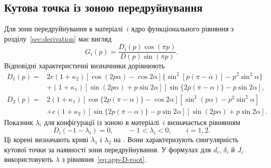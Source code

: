 \subsection{Кутова точка із зоною передруйнування}

Для зони передруйнування в матеріалі~$i$ ядро функціонального рівняння з розділу~\ref{sec:derivation} має вигляд
\begin{equation*}
  G_i(p)=\frac{D_i(p)\cos(\pi p)}{D(p)\sin(\pi p)}.
\end{equation*}
Відповідні характеристичні визначники дорівнюють
\begin{equation}
\label{eq:app-post-zone-determinants}
\begin{aligned}
  D_1(p)={}&2e(1+\kappa_2)
  [\cos(2p\alpha)-\cos2\alpha]
  \{\sin^2[p(\pi-\alpha)]-p^2\sin^2\alpha\}\\
  &+(1+\kappa_1)
  [\sin(2p\alpha)+p\sin2\alpha]
  [\sin\{2p(\pi-\alpha)\}-p\sin2\alpha],\\[3pt]
  D_2(p)={}&2(1+\kappa_1)
  [\cos\{2p(\pi-\alpha)\}-\cos2\alpha]
  [\sin^2(p\alpha)-p^2\sin^2\alpha]\\
  &+e(1+\kappa_2)
  [\sin\{2p(\pi-\alpha)\}-p\sin2\alpha]
  [\sin(2p\alpha)+p\sin2\alpha].
\end{aligned}
\end{equation}
Показник $\lambda_i$ для конфігурації із зоною в матеріалі~$i$ визначається рівнянням
\begin{equation}
\label{eq:app-post-zone-root}
  D_i(-1-\lambda_i)=0,
  \qquad -1<\lambda_i<0,
  \qquad i=1,2.
\end{equation}
Ці корені визначають криві $\lambda_1$ і $\lambda_2$ на \SingularityExponentFigure. Вони характеризують сингулярність кутової точки за наявності зони передруйнування. У формулах для $d_i$, $\delta_i$ й $J_i$ використовують $\lambda$ з рівняння~\eqref{eq:app-D-root}.

\begin{english}\end{english}
